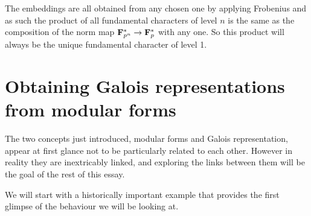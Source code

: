 \documentclass[a4paper,12pt]{article}
\begin{document}
\begin{rmk}\label{rmk:prodchar}
The embeddings are all obtained from any chosen one by applying Frobenius and as such the product of all fundamental characters of level $n$ is the same as the composition of the norm map $\mathbf{F}_{p^n}^* \to \mathbf{F}_p^*$ with any one.
So this product will always be the unique fundamental character of level 1.
\end{rmk}




\section{Obtaining Galois representations from modular forms}
The two concepts just introduced, modular forms and Galois representation, appear at first glance not to be particularly related to each other.
However in reality they are inextricably linked, and exploring the links between them will be the goal of the rest of this essay.

We will start with a historically important example that provides the first glimpse of the behaviour we will be looking at.
\end{document}

